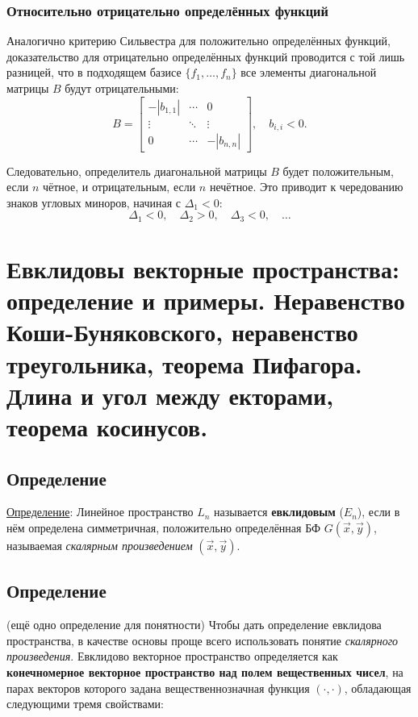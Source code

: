 \documentclass[12pt]{article}
\begin{document}
\subsubsection*{Относительно отрицательно определённых функций}
Аналогично критерию Сильвестра для положительно определённых функций, доказательство для отрицательно определённых функций проводится с той лишь разницей, что в подходящем базисе $\{f_1, \dots, f_n\}$ все элементы диагональной матрицы $B$ будут отрицательными:
\[
B =
\begin{bmatrix}
-|b_{1,1}| & \cdots & 0 \\
\vdots & \ddots & \vdots \\
0 & \cdots & -|b_{n,n}|
\end{bmatrix}, \quad b_{i,i} < 0.
\]

Следовательно, определитель диагональной матрицы $B$ будет положительным, если $n$ чётное, и отрицательным, если $n$ нечётное. Это приводит к чередованию знаков угловых миноров, начиная с $\Delta_1 < 0$:
\[
\Delta_1 < 0, \quad \Delta_2 > 0, \quad \Delta_3 < 0, \quad \dots
\]

\section{Евклидовы векторные пространства: определение и примеры. Неравенство Коши-Буняковского, неравенство треугольника, теорема Пифагора. Длина и угол между екторами, теорема косинусов.}

\subsection*{Определение}
\underline{Определение}: Линейное пространство $L_n$ называется \textbf{евклидовым} ($E_n$), если в нём определена симметричная, положительно определённая БФ $G(\vec{x}, \vec{y})$, называемая \textit{скалярным произведением} $(\vec{x}, \vec{y})$.

\subsection*{Определение}
(ещё одно определение для понятности) Чтобы дать определение евклидова пространства, в качестве основы проще всего использовать понятие \textit{скалярного произведения}. Евклидово векторное пространство определяется как \textbf{конечномерное векторное пространство над полем вещественных чисел}, на парах векторов которого задана вещественнозначная функция $(\cdot, \cdot)$, обладающая следующими тремя свойствами:
\end{document}
